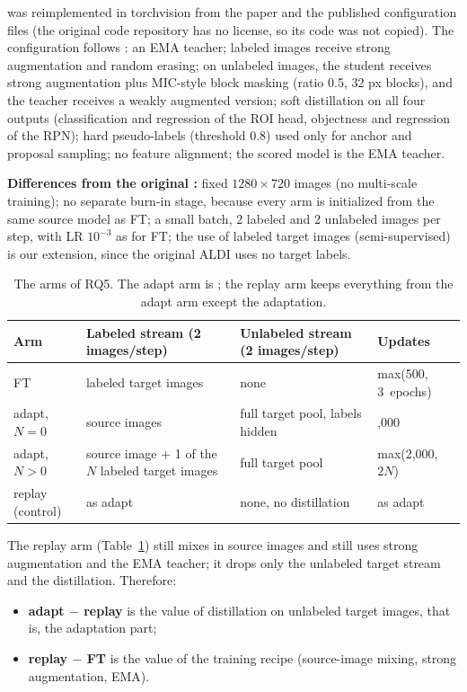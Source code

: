 \aldi was reimplemented in torchvision from the paper and the published configuration files (the original code repository has no license, so its code was not copied). The configuration follows \aldi: an EMA teacher; labeled images receive strong augmentation and random erasing; on unlabeled images, the student receives strong augmentation plus MIC-style block masking (ratio 0.5, 32 px blocks), and the teacher receives a weakly augmented version; soft distillation on all four outputs (classification and regression of the ROI head, objectness and regression of the RPN); hard pseudo-labels (threshold 0.8) used only for anchor and proposal sampling; no feature alignment; the scored model is the EMA teacher.

\textbf{Differences from the original \aldi:} fixed $1280\times720$ images (no multi-scale training); no separate burn-in stage, because every arm is initialized from the same source model as FT; a small batch, 2 labeled and 2 unlabeled images per step, with LR $10^{-3}$ as for FT; the use of labeled target images (semi-supervised) is our extension, since the original ALDI uses no target labels.

\begin{table}[t]
\centering
\caption{The arms of RQ5. The adapt arm is \aldi; the replay arm keeps everything from the adapt arm except the adaptation.}
\label{tab:arms}
\footnotesize
\setlength{\tabcolsep}{3pt}
\begin{tabular}{@{}>{\raggedright\arraybackslash}p{0.6in}>{\raggedright\arraybackslash}p{0.95in}>{\raggedright\arraybackslash}p{0.85in}>{\raggedright\arraybackslash}p{0.75in}@{}}
\toprule
Arm & Labeled stream (2 images/step) & Unlabeled stream (2 images/step) & Updates \\
\midrule
FT & 2 labeled target images & none & max(500, 3~epochs) \\
adapt, $N = 0$ & 2 source images & full target pool, labels hidden & 2,000 \\
adapt, $N > 0$ & 1 source image + 1 of the $N$ labeled target images & full target pool & max(2,000, $2N$) \\
replay (control) & as adapt & none, no distillation & as adapt \\
\bottomrule
\end{tabular}
\end{table}

The replay arm (Table~\ref{tab:arms}) still mixes in source images and still uses strong augmentation and the EMA teacher; it drops only the unlabeled target stream and the distillation. Therefore:
\begin{itemize}
\item \textbf{adapt $-$ replay} is the value of distillation on unlabeled target images, that is, the adaptation part;
\item \textbf{replay $-$ FT} is the value of the training recipe (source-image mixing, strong augmentation, EMA).
\end{itemize}

